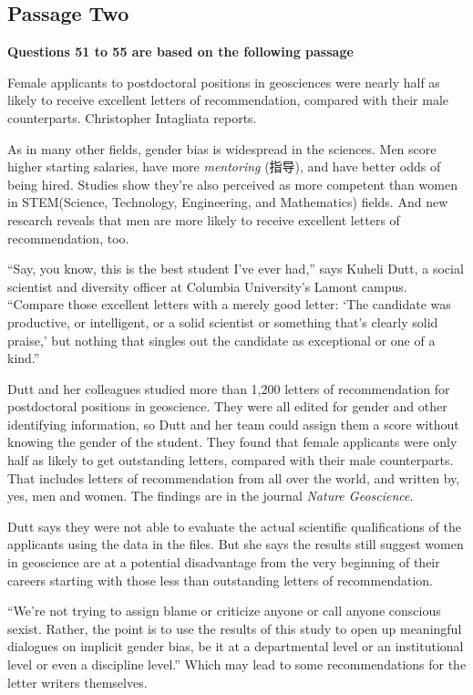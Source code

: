 \documentclass[UTF8,11pt]{ctexart}
\begin{document}
\subsection*{\textbf{Passage Two}}


\textbf{Questions 51 to 55 are based on the following passage}


Female applicants to postdoctoral positions in geosciences were nearly half as likely to receive excellent letters of recommendation, compared with their male counterparts. Christopher Intagliata reports.


As in many other fields, gender bias is widespread in the sciences. Men score higher starting salaries, have more \textit{mentoring} (指导), and have better odds of being hired. Studies show they’re also perceived as more competent than women in STEM(Science, Technology, Engineering, and Mathematics) fields. And new research reveals that men are more likely to receive excellent letters of recommendation, too.


“Say, you know, this is the best student I’ve ever had,” says Kuheli Dutt, a social scientist and diversity officer at Columbia University’s Lamont campus. “Compare those excellent letters with a merely good letter: ‘The candidate was productive, or intelligent, or a solid scientist or something that’s clearly solid praise,’ but nothing that singles out the candidate as exceptional or one of a kind.”


Dutt and her colleagues studied more than 1,200 letters of recommendation for postdoctoral positions in geoscience. They were all edited for gender and other identifying information, so Dutt and her team could assign them a score without knowing the gender of the student. They found that female applicants were only half as likely to get outstanding letters, compared with their male counterparts. That includes letters of recommendation from all over the world, and written by, yes, men and women. The findings are in the journal\textit{ Nature Geoscience}.


Dutt says they were not able to evaluate the actual scientific qualifications of the applicants using the data in the files. But she says the results still suggest women in geoscience are at a potential disadvantage from the very beginning of their careers starting with those less than outstanding letters of recommendation.


“We’re not trying to assign blame or criticize anyone or call anyone conscious sexist. Rather, the point is to use the results of this study to open up meaningful dialogues on implicit gender bias, be it at a departmental level or an institutional level or even a discipline level.” Which may lead to some recommendations for the letter writers themselves.
\end{document}

